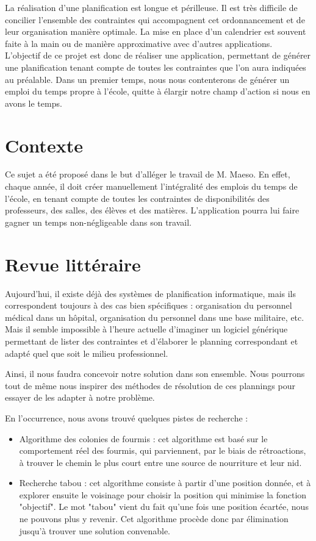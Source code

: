 \documentclass[12pt,a4paper,french]{article}
\begin{document}
La réalisation d'une planification est longue et périlleuse. Il est très difficile de concilier l'ensemble des contraintes qui accompagnent cet ordonnancement et de leur organisation manière optimale. La mise en place d'un calendrier est souvent faite à la main ou de manière approximative avec d'autres applications.\\

L'objectif de ce projet est donc de réaliser une application, permettant de générer une planification tenant compte de toutes les contraintes que l'on aura indiquées au préalable. Dans un premier temps, nous nous contenterons de générer un emploi du temps propre à l'école, quitte à élargir notre champ d'action si nous en avons le temps.

\newpage
\section{Contexte}

Ce sujet a été proposé dans le but d'alléger le travail de M. Maeso. En effet, chaque année, il doit créer manuellement l'intégralité des emplois du temps de l'école, en tenant compte de toutes les contraintes de disponibilités des professeurs, des salles, des élèves et des matières. L'application pourra lui faire gagner un temps non-négligeable dans son travail.

\newpage
\section{Revue littéraire}

Aujourd'hui, il existe déjà des systèmes de planification informatique, mais ils correspondent toujours à des cas bien spécifiques : organisation du personnel médical dans un hôpital, organisation du personnel dans une base militaire, etc. Mais il semble impossible à l'heure actuelle d'imaginer un logiciel générique permettant de lister des contraintes et d'élaborer le planning correspondant et adapté quel que soit le milieu professionnel.

Ainsi, il nous faudra concevoir notre solution dans son ensemble. Nous pourrons tout de même nous inspirer des méthodes de résolution de ces plannings pour essayer de les adapter à notre problème.

En l'occurrence, nous avons trouvé quelques pistes de recherche :
\begin{itemize}
\item Algorithme des colonies de fourmis : cet algorithme est basé sur le comportement réel des fourmis, qui parviennent, par le biais de rétroactions, à trouver le chemin le plus court entre une source de nourriture et leur nid.
\cite{02-algoFourmis}
\item Recherche tabou : cet algorithme consiste à partir d'une position donnée, et à explorer ensuite le voisinage pour choisir la position qui minimise la fonction "objectif". Le mot "tabou" vient du fait qu'une fois une position écartée, nous ne pouvons plus y revenir. Cet algorithme procède donc par élimination jusqu'à trouver une solution convenable.
\cite{03-algoTabou}
\end{itemize}
\end{document}
